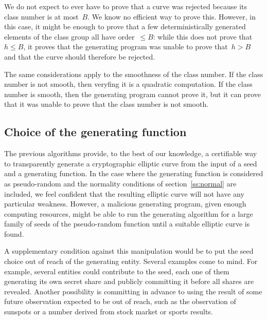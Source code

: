 \documentclass{article}
\begin{document}
We do not expect to ever have to prove that a curve was rejected
because its class number is at most~$B$.
We know no efficient way to prove this.
However, in this case, it might be enough to prove
that a few deterministically generated elements of the class group
all have order~$≤ B$:
while this does not prove that~$h ≤ B$,
it proves that the generating program was unable to prove that~$h > B$
and that the curve should therefore be rejected.

\smallskip

The same considerations apply to the smoothness of the class number.
If the class number is not smooth, then
veryfing it is a quadratic computation.
If the class number is smooth, then
the generating program cannot prove it,
but it can prove that it was unable to prove that
the class number is not smooth.




\subsection{Choice of the generating function}

The previous algorithms provide, to the best of our knowledge,
a certifiable way to transparently generate a cryptographic elliptic curve
from the input of a seed and a generating function.
In the case where the generating function is considered as pseudo-random
and the normality conditions of section~\ref{ss:normal} are included,
we feel confident that the resulting elliptic curve
will not have any particular weakness.
However, a malicious generating program, given enough computing resources,
might be able to run the generating algorithm
for a large family of seeds of the pseudo-random function
until a suitable elliptic curve is found.

A supplementary condition against this manipulation
would be to put the seed choice out of reach of the generating entity.
Several examples come to mind.
For example, several entities could contribute to the seed,
each one of them generating its own secret share
and publicly committing it before all shares are revealed.
Another possibility is committing in advance to using
the result of some future observation expected to be out of reach,
such as the observation of sunspots
or a number derived from stock market or sports results.



\end{document}
